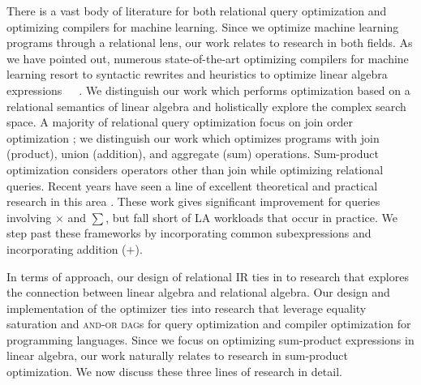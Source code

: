 There is a vast body of literature for both relational query optimization and
optimizing compilers for machine learning. Since we optimize machine learning programs through a
relational lens, our work relates to research in both fields. As we have pointed
out, numerous state-of-the-art optimizing compilers for machine learning
 resort to syntactic rewrites and heuristics to optimize linear algebra
expressions~\cite{DBLP:reference/bdt/Boehm19}~\cite{DBLP:conf/icml/SujeethLBRCWAOO11}~\cite{DBLP:conf/sigmod/HuangB013}. We distinguish our work which performs optimization based on a
relational semantics of linear algebra and holistically explore the complex
search space. A majority of relational query optimization focus on join order
optimization \cite{Graefe95a} \cite{MoerkotteN06} \cite{MoerkotteN08}
\cite{selinger1979access}; we distinguish our work which optimizes programs with
join (product), union (addition), and aggregate (sum) operations. Sum-product optimization considers operators other than join while optimizing
relational queries. Recent years have seen a line of excellent theoretical and
practical research in this area \cite{KhamisNR16} \cite{Joglekar2016AJARAA}.
These work gives significant improvement for queries involving $\times$ and $\sum$,
but fall short of LA workloads that occur in practice. We step past these
frameworks by incorporating common subexpressions and incorporating addition
($+$). 

In terms of approach, our design of relational IR ties in to research that
explores the connection between linear algebra and relational algebra. Our
design and implementation of the optimizer ties into research that leverage
equality saturation and \textsc{and-or dag}s for query optimization and compiler
optimization for programming languages. Since we focus on optimizing sum-product
expressions in linear algebra, our work naturally relates to research in sum-product
optimization. We now discuss these three lines of research in detail. 

